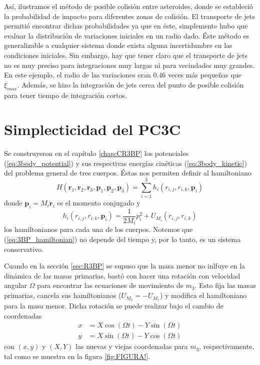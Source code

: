 Así, ilustramos el método de posible colisión entre asteroides, donde se estableció la probabilidad de impacto para diferentes zonas de colisión. El transporte de jets permitió encontrar dichas probabilidades ya que en éste, simplemente hubo que evaluar la distribución de variaciones iniciales en un radio dado. Éste método es generalizable a cualquier sistema donde exista alguna incertidumbre en las condiciones iniciales. Sin embargo, hay que tener claro que el transporte de jets no es muy preciso para integraciones muy largas ni para vecindades muy grandes. En este ejemplo, el radio de las variaciones eran $0.46$ veces más pequeñas que $\xi_{max}$. Además, se hizo la integración de jets cerca del punto de posible colisión para tener tiempo de integración cortos. 


\section{Simplecticidad del PC3C}
\label{sec:C3BP_simplecticity}

Se construyeron en el capítulo \ref{chap:CR3BP} los potenciales (\ref{eq:3body_potential}) y sus respectivas energías cinéticas (\ref{eq:3body_kinetic}) del problema general de tres cuerpos. Éstas nos permiten definir al hamiltoniano
\begin{equation}
 H(\mathbf{r}_1, \mathbf{r}_2, \mathbf{r}_3, \mathbf{p}_1, \mathbf{p}_2, \mathbf{p}_3) = \sum_{i=1}^3 h_i(r_{i,j}, r_{i,k}, \mathbf{p}_i)
 \label{eq:3BP_hamiltonian}
\end{equation} 
donde $\mathbf{p}_i = M_i \dot{\mathbf{r}}_i$ es el momento conjugado y
\begin{equation}
 h_i(r_{i,j}, r_{i,k}, \mathbf{p}_i) = \frac{1}{2 M_i} p_i^2 + U_{M_i}(r_{i,j}, r_{i,k})
 \label{eq:individual_hamiltonian}
\end{equation}
los hamiltonianos para cada una de los cuerpos. Notemos que (\ref{eq:3BP_hamiltonian}) no depende del tiempo y, por lo tanto, es un sistema conservativo. 

Cuando en la sección \ref{sec:R3BP} se supuso que la masa menor no inlfuye en la dinámica de las masas primarias, bastó con hacer una rotación con velocidad angular $\Omega$ para encontrar las ecuaciones de movimiento de $m_3$. Esto fija las masas primarias, cancela sus hamiltonianos ($  U_{M_2} = - U_{M_1}$) y modifica el hamiltoniano para la masa menor. Dicha rotación se puede realizar bajo el cambio de coordenadas
\begin{align*}
 x &= X\cos (\Omega t) - Y \sin (\Omega t) \\
 y &= X\sin (\Omega t) - Y \cos (\Omega t) 
\end{align*} 
con $(x,y)$ y $(X,Y)$ las nuevas y viejas coordenadas para $m_3$, respectivamente, tal como se muestra en la figura \ref{fig:FIGURA!}.

